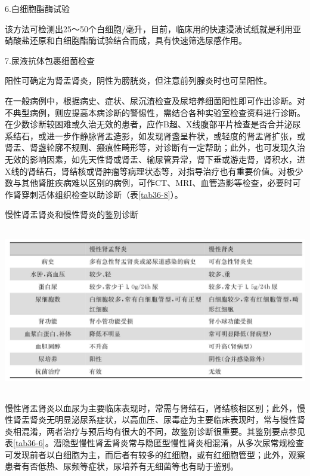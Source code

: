 \hypertarget{text00283.htmlux5cux23CHP36-4-3-1-1-2-6}{}
6.白细胞酯酶试验

该方法可检测出25～50个白细胞/毫升，目前，临床用的快速浸渍试纸就是利用亚硝酸盐还原和白细胞酯酶试验结合而成，具有快速筛选尿感作用。

\hypertarget{text00283.htmlux5cux23CHP36-4-3-1-1-2-7}{}
7.尿液抗体包裹细菌检查

阳性可确定为肾盂肾炎，阴性为膀胱炎，但注意前列腺炎时也可呈阳性。

在一般病例中，根据病史、症状、尿沉渣检查及尿培养细菌阳性即可作出诊断。对不典型病例，则应提高本病诊断的警惕性，需结合各种实验室检查资料进行诊断。在少数诊断较困难或久治无效的患者，应作B超、X线腹部平片检查是否合并泌尿系结石，或进一步作静脉肾盂造影，如发现肾盏呈杵状，或轻度的肾盂肾扩张，或肾盂、肾盏轮廓不规则、瘢痕性畸形等，对诊断有一定帮助；此外，也可发现久治无效的影响因素，如先天性肾或肾盂、输尿管异常，肾下垂或游走肾，肾积水，进X线的肾结石，肾结核或肾肿瘤等病理状态等，对指导治疗也有重要价值。对极少数与其他肾脏疾病难以区别的病例，可作CT、MRI、血管造影等检查，必要时可作肾穿刺活体组织检查以助诊断（表\ref{tab36-8}）。

\begin{table}[htbp]
\centering
\caption{慢性肾盂肾炎和慢性肾炎的鉴别诊断}
\label{tab36-8}
\includegraphics[width=5.98958in,height=2.82292in]{./images/Image00231.jpg}
\end{table}

慢性肾盂肾炎以血尿为主要临床表现时，常需与肾结石，肾结核相区别；此外，慢性肾盂肾炎无明显泌尿系症状，以高血压、尿毒症为主要临床表现时，常与慢性肾炎相混淆，两者治疗与预后均有很大的不同，故鉴别诊断很重要。其鉴别要点参见表\ref{tab36-6}。潜隐型慢性肾盂肾炎常与隐匿型慢性肾炎相混淆，从多次尿常规检查可发现前者以白细胞为主，而后者有较多的红细胞，或有红细胞管型；此外，观察患者有否低热、尿频等症状，尿培养有无细菌等也有助于鉴别。

